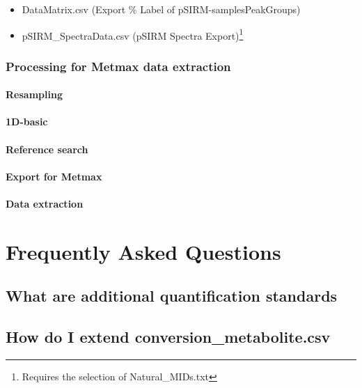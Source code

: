 \documentclass[]{book}
\providecommand{\tightlist}{%
  \setlength{\itemsep}{0pt}\setlength{\parskip}{0pt}}
\let\rmarkdownfootnote\footnote%
\def\footnote{\protect\rmarkdownfootnote}
\theoremstyle{definition}
\theoremstyle{definition}
\theoremstyle{definition}
\theoremstyle{remark}
\begin{document}
\begin{itemize}
\tightlist
\item
  DataMatrix.csv (Export \% Label of pSIRM-samplesPeakGroups)
\item
  pSIRM\_SpectraData.csv (pSIRM Spectra Export)\footnote{Requires the
    selection of Natural\_MIDs.txt}
\end{itemize}

\subsection{Processing for Metmax data
extraction}\label{processing-for-metmax-data-extraction}

\subsubsection{Resampling}\label{resampling-1}

\subsubsection{1D-basic}\label{d-basic}

\subsubsection{Reference search}\label{reference-search}

\subsubsection{Export for Metmax}\label{export-for-metmax}

\subsubsection{Data extraction}\label{data-extraction}

\chapter{Frequently Asked Questions}\label{FAQ}

\section{What are additional quantification
standards}\label{what-are-additional-quantification-standards}

\section{How do I extend
conversion\_metabolite.csv}\label{how-do-i-extend-conversion_metabolite.csv}


\end{document}
